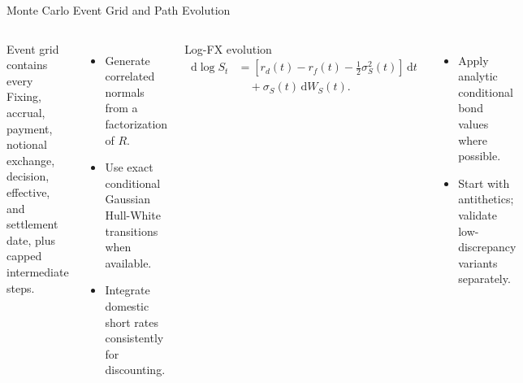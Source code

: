\documentclass[aspectratio=169]{beamer}
\newcommand{\dd}{\,\mathrm{d}}
\begin{document}
\begin{frame}{Monte Carlo Event Grid and Path Evolution}
  \begin{columns}[T,onlytextwidth]
      \begin{block}{Event grid contains every}
        Fixing, accrual, payment, notional exchange, decision, effective, and
        settlement date, plus capped intermediate steps.
      \end{block}
      \begin{itemize}
        \item Generate correlated normals from a factorization of $R$.
        \item Use exact conditional Gaussian Hull-White transitions when available.
        \item Integrate domestic short rates consistently for discounting.
      \end{itemize}
      \begin{block}{Log-FX evolution}
        \[
          \begin{aligned}
          \dd\log S_t
            &=\left[r_d(t)-r_f(t)-\tfrac12\sigma_S^2(t)\right]\dd t\\
            &\quad+\sigma_S(t)\dd W_S(t).
          \end{aligned}
        \]
      \end{block}
      \begin{itemize}
        \item Apply analytic conditional bond values where possible.
        \item Start with antithetics; validate low-discrepancy variants separately.
      \end{itemize}
  \end{columns}
\end{frame}
\end{document}
